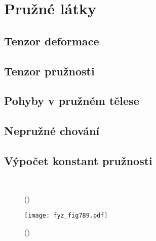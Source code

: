 \setchaptertoc
\chapter{Pružné látky}\label{fyz:IIchapIXL}

  \section{Tenzor deformace}\label{fyz:IIchapIXLsecI}
  \section{Tenzor pružnosti}\label{fyz:IIchapIXLsecII}
  \section{Pohyby v pružném tělese}\label{fyz:IIchapIXLsecIII}
  \section{Nepružné chování}\label{fyz:IIchapIXLsecIV}
  \section{Výpočet konstant pružnosti}\label{fyz:IIchapIXLsecV}

    \begin{figure}[ht!]
      \centering
                     \\
      \label{fyz:fig788}
      \caption{
               (\cite[s.~748]{Feynman02})}
    \end{figure}

    \begin{figure}[ht!] %
      \centering
      \texttt{[image: fyz\_fig789.pdf]}
      \caption{
               (\cite[s.~707]{Feynman02})}
      \label{fyz:fig789}
    \end{figure}

